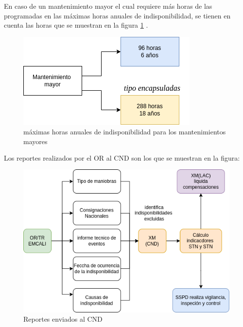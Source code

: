 \documentclass[a5paper]{book}%
\begin{document}
En caso de un mantenimiento mayor el cual requiere más horas de las programadas en las máximas horas anuales de indisponibilidad, se tienen en cuenta las horas que se muestran en la figura \ref{fig:mayor} \cite{CREG0152018}.

    \begin{figure}[H]
      \centering
      \caption{máximas horas anuales de indisponibilidad para los mantenimientos mayores}
      \label{fig:mayor}
      \includegraphics[width=\linewidth]{mantenimoento_mayor}
    \end{figure}
  

  Los reportes realizados por el \ac{OR} al \ac{CND} son los que se muestran en la figura:
  
\begin{figure}[H]
  \centering
  \caption{Reportes enviados al CND}
  \label{fig:reportes_transmision}
  \includegraphics[width=\linewidth ]{reportes_transmision}
\end{figure}
  
\end{document}
